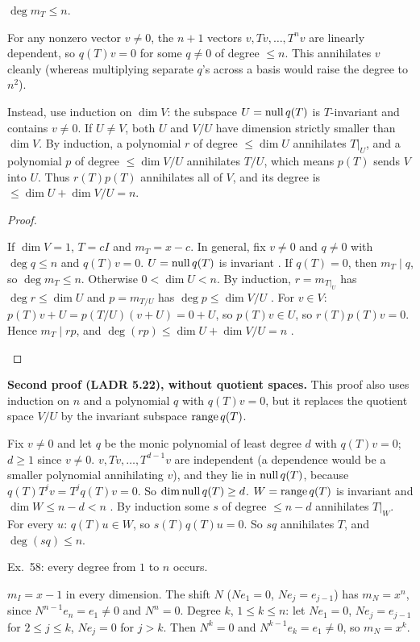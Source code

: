 \documentclass[10pt]{scrartcl}
\begin{document}
\begin{proposition*}\hypertarget{prop-67}{}\label{prop-67}
  $\deg m_T\le n$.
\end{proposition*}
\begin{ideabox}
For any nonzero vector $v\ne 0$, the $n+1$ vectors $v,Tv,\dots,T^nv$ are linearly dependent, so $q(T)v=0$ for some $q\ne 0$ of degree $\le n$. This annihilates $v$ cleanly (whereas multiplying separate $q$'s across a basis would raise the degree to $n^2$).

Instead, use induction on $\dim V$: the subspace $U=\operatorname{null} q(T)$ is $T$-invariant and contains $v\ne 0$. If $U\ne V$, both $U$ and $V/U$ have dimension strictly smaller than $\dim V$. By induction, a polynomial $r$ of degree $\le\dim U$ annihilates $T|_U$, and a polynomial $p$ of degree $\le\dim V/U$ annihilates $T/U$, which means $p(T)$ sends $V$ into $U$. Thus $r(T)p(T)$ annihilates all of $V$, and its degree is $\le\dim U+\dim V/U=n$.
\end{ideabox}
\begin{proof}
  \begin{steps}
    \ii If $\dim V=1$, $T=cI$ and $m_T=x-c$. In general, fix $v\ne0$ and $q\ne0$ with $\deg q\le n$ and $q(T)v=0$. $U=\operatorname{null} q(T)$ is invariant .
    \ii If $q(T)=0$, then $m_T\mid q$, so $\deg m_T\le n$.
    \ii Otherwise $0<\dim U<n$. By induction, $r=m_{T|_U}$ has $\deg r\le\dim U$ and $p=m_{T/U}$ has $\deg p\le\dim V/U$ .
    \ii For $v\in V$: $p(T)v+U=p(T/U)(v+U)=0+U$, so $p(T)v\in U$, so $r(T)p(T)v=0$. Hence $m_T\mid rp$, and $\deg(rp)\le\dim U+\dim V/U=n$ .
  \end{steps}
\end{proof}
\textbf{Second proof (LADR 5.22), without quotient spaces.} This proof also uses induction on $n$ and a polynomial $q$ with $q(T)v=0$, but it replaces the quotient space $V/U$ by the invariant subspace $\operatorname{range} q(T)$.
\begin{steps}
  \ii Fix $v\ne0$ and let $q$ be the monic polynomial of least degree $d$ with $q(T)v=0$; $d\ge1$ since $v\ne0$.
  \ii $v,Tv,\dots,T^{d-1}v$ are independent (a dependence would be a smaller polynomial annihilating $v$), and they lie in $\operatorname{null} q(T)$, because $q(T)T^jv=T^jq(T)v=0$. So $\dim\operatorname{null} q(T)\ge d$.
  \ii $W=\operatorname{range} q(T)$ is invariant  and $\dim W\le n-d<n$ . By induction some $s$ of degree $\le n-d$ annihilates $T|_W$.
  \ii For every $u$: $q(T)u\in W$, so $s(T)q(T)u=0$. So $sq$ annihilates $T$, and $\deg(sq)\le n$.
\end{steps}
\begin{itemize}
  \ii Ex.~58: every degree from $1$ to $n$ occurs.
  \begin{itemize}
    \ii $m_I=x-1$ in every dimension.
    \ii The shift $N$ ($Ne_1=0$, $Ne_j=e_{j-1}$) has $m_N=x^n$, since $N^{n-1}e_n=e_1\ne0$ and $N^n=0$.
    \ii Degree $k$, $1\le k\le n$: let $Ne_1=0$, $Ne_j=e_{j-1}$ for $2\le j\le k$, $Ne_j=0$ for $j>k$. Then $N^k=0$ and $N^{k-1}e_k=e_1\ne0$, so $m_N=x^k$.
  \end{itemize}
\end{itemize}
\end{document}
